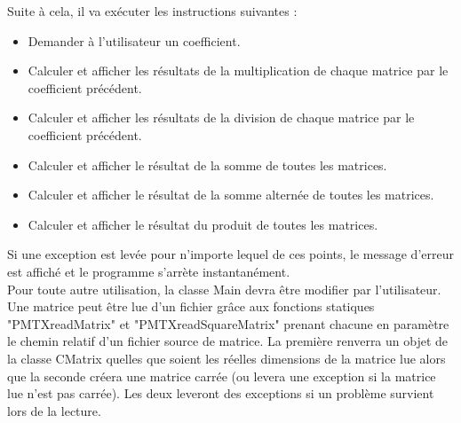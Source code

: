 	Suite à cela, il va exécuter les instructions suivantes :
	\begin{itemize}
		\item Demander à l'utilisateur un coefficient.
		\item Calculer et afficher les résultats de la multiplication de chaque matrice par le coefficient précédent.
		\item Calculer et afficher les résultats de la division de chaque matrice par le coefficient précédent.
		\item Calculer et afficher le résultat de la somme de toutes les matrices.
		\item Calculer et afficher le résultat de la somme alternée de toutes les matrices.
		\item Calculer et afficher le résultat du produit de toutes les matrices. \\
	\end{itemize}
	Si une exception est levée pour n'importe lequel de ces points, le message d'erreur est affiché et le programme s'arrète instantanément.\\
	
	Pour toute autre utilisation, la classe Main devra être modifier par l'utilisateur. Une matrice peut être lue d'un fichier grâce aux fonctions statiques "PMTXreadMatrix" et "PMTXreadSquareMatrix" prenant chacune en paramètre le chemin relatif d'un fichier source de matrice. La première renverra un objet de la classe CMatrix quelles que soient les réelles dimensions de la matrice lue alors que la seconde créera une matrice carrée (ou levera une exception si la matrice lue n'est pas carrée). Les deux leveront des exceptions si un problème survient lors de la lecture.
	


